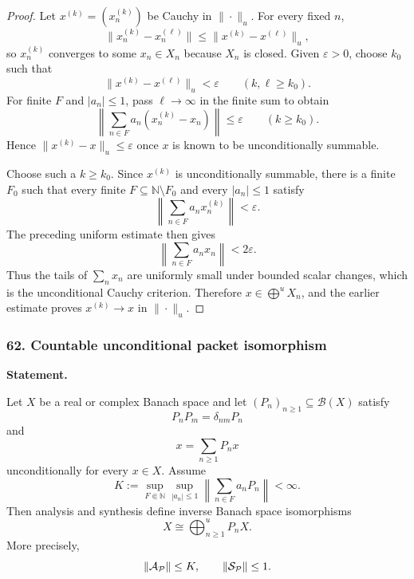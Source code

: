 \begin{proof}
Let $x^{(k)}=(x_n^{(k)})$ be Cauchy in $\|\cdot\|_u$.  For every fixed $n$,
\[
\|x_n^{(k)}-x_n^{(\ell)}\|
\leq
\|x^{(k)}-x^{(\ell)}\|_u,
\]
so $x_n^{(k)}$ converges to some $x_n\in X_n$ because $X_n$ is closed.  Given $\varepsilon>0$, choose $k_0$ such that
\[
\|x^{(k)}-x^{(\ell)}\|_u<\varepsilon
\qquad(k,\ell\geq k_0).
\]
For finite $F$ and $|a_n|\leq1$, pass $\ell\to\infty$ in the finite sum to obtain
\[
\left\|\sum_{n\in F}a_n(x_n^{(k)}-x_n)\right\|
\leq\varepsilon
\qquad(k\geq k_0).
\]
Hence $\|x^{(k)}-x\|_u\leq\varepsilon$ once $x$ is known to be unconditionally summable.

Choose such a $k\geq k_0$.  Since $x^{(k)}$ is unconditionally summable, there is a finite $F_0$ such that every finite $F\subseteq\mathbb N\setminus F_0$ and every $|a_n|\leq1$ satisfy
\[
\left\|\sum_{n\in F}a_nx_n^{(k)}\right\|<\varepsilon.
\]
The preceding uniform estimate then gives
\[
\left\|\sum_{n\in F}a_nx_n\right\|<2\varepsilon.
\]
Thus the tails of $\sum_nx_n$ are uniformly small under bounded scalar changes, which is the unconditional Cauchy criterion.  Therefore $x\in\bigoplus^uX_n$, and the earlier estimate proves $x^{(k)}\to x$ in $\|\cdot\|_u$.
\end{proof}
\subsubsection*{62. Countable unconditional packet isomorphism}
\label{rec:PSC-I-T-COUNTABLE-UNCONDITIONAL-PACKETS}
\textbf{Statement.}\par
Let $X$ be a real or complex Banach space and let $(P_n)_{n\geq1}\subseteq\mathcal B(X)$ satisfy
\[
P_nP_m=\delta_{nm}P_n
\]
and
\[
x=\sum_{n\geq1}P_nx
\]
unconditionally for every $x\in X$.  Assume
\[
K:=
\sup_{F\Subset\mathbb N}
\sup_{|a_n|\leq1}
\left\|\sum_{n\in F}a_nP_n\right\|<\infty.
\]
Then analysis and synthesis define inverse Banach space isomorphisms
\[
\boxed{
X\cong\bigoplus_{n\geq1}^{u}P_nX.
}
\]
More precisely,
\[
\|\mathcal A_{\mathcal P}\|\leq K,
\qquad
\|\mathcal S_{\mathcal P}\|\leq1.
\]

